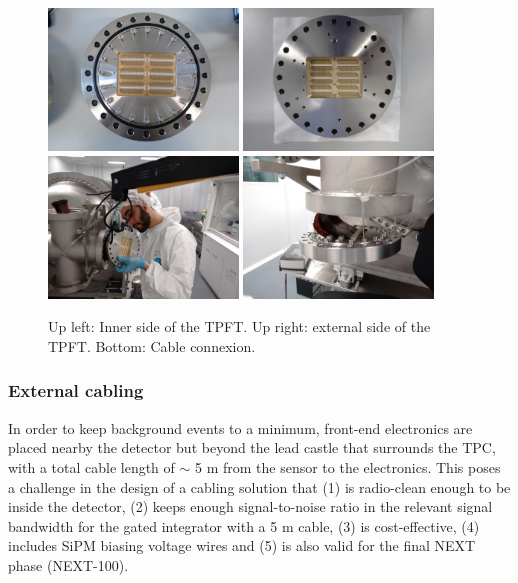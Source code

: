 \begin{figure}[hpt!]
\centering
\includegraphics[width=0.45\textwidth]{TrackingPlane/IMG/TPFT1}
\includegraphics[width=0.45\textwidth]{TrackingPlane/IMG/TPFT2}
\includegraphics[width=0.45\textwidth]{img/TPFTI.png}
\includegraphics[width=0.45\textwidth]{TrackingPlane/IMG/TPFT_connected}
\caption{Up left: Inner side of the TPFT. Up right: external side of the TPFT. Bottom: Cable connexion.}
\label{fig:TPFT}
\end{figure}


\subsubsection*{External cabling}\label{sec:ext}
In order to keep background events to a minimum, front-end electronics are placed nearby the detector but beyond the lead castle that surrounds the TPC, with a total cable length of $\sim$ 5 m from the sensor to the electronics. This poses a challenge in the design of a cabling solution that (1) is radio-clean enough to be inside the detector, (2) keeps enough signal-to-noise ratio in the relevant signal bandwidth for the gated integrator with a 5 m cable, (3) is cost-effective, (4) includes SiPM biasing voltage wires and (5) is also valid for the final NEXT phase (NEXT-100).

